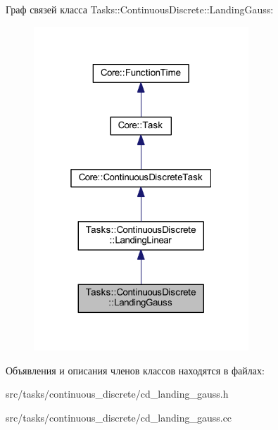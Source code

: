 Граф связей класса Tasks\+:\+:Continuous\+Discrete\+:\+:Landing\+Gauss\+:\nopagebreak
\begin{figure}[H]
\begin{center}
\leavevmode
\includegraphics[width=229pt]{class_tasks_1_1_continuous_discrete_1_1_landing_gauss__coll__graph}
\end{center}
\end{figure}


Объявления и описания членов классов находятся в файлах\+:\begin{DoxyCompactItemize}
\item 
src/tasks/continuous\+\_\+discrete/cd\+\_\+landing\+\_\+gauss.\+h\item 
src/tasks/continuous\+\_\+discrete/cd\+\_\+landing\+\_\+gauss.\+cc\end{DoxyCompactItemize}
